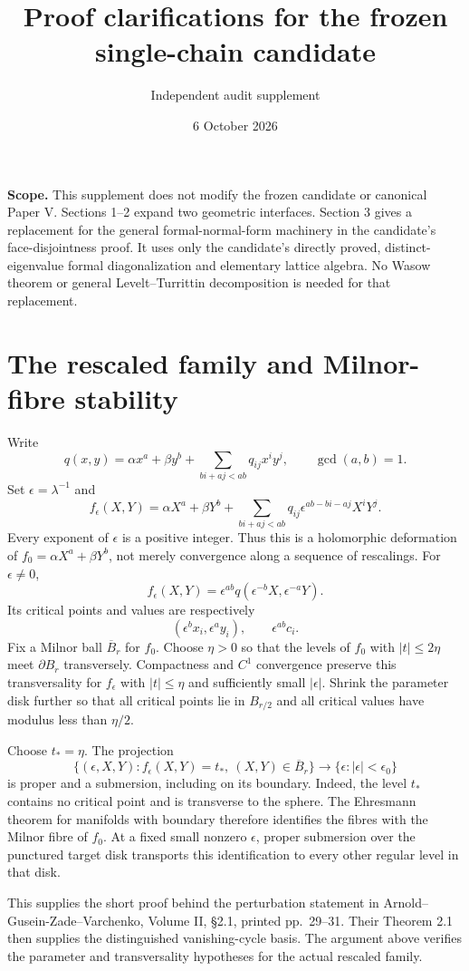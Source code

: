 \documentclass[11pt]{article}
\title{Proof clarifications for the frozen single-chain candidate}
\author{Independent audit supplement}
\date{6 October 2026}
\begin{document}
\maketitle
\noindent\textbf{Scope.} This supplement does not modify the frozen candidate or canonical Paper V. Sections 1--2 expand two geometric interfaces. Section 3 gives a replacement for the general formal-normal-form machinery in the candidate's face-disjointness proof. It uses only the candidate's directly proved, distinct-eigenvalue formal diagonalization and elementary lattice algebra. No Wasow theorem or general Levelt--Turrittin decomposition is needed for that replacement.

\section{The rescaled family and Milnor-fibre stability}
Write
\[
 q(x,y)=\alpha x^a+\beta y^b+
 \sum_{bi+aj<ab}q_{ij}x^iy^j,
 \qquad \gcd(a,b)=1.
\]
Set $\epsilon=\lambda^{-1}$ and
\[
 f_\epsilon(X,Y)=\alpha X^a+\beta Y^b+
 \sum_{bi+aj<ab}q_{ij}\epsilon^{ab-bi-aj}X^iY^j.
\]
Every exponent of $\epsilon$ is a positive integer. Thus this is a holomorphic deformation of $f_0=\alpha X^a+\beta Y^b$, not merely convergence along a sequence of rescalings. For $\epsilon\ne0$,
\[
 f_\epsilon(X,Y)=\epsilon^{ab}q(\epsilon^{-b}X,\epsilon^{-a}Y).
\]
Its critical points and values are respectively
\[
 (\epsilon^b x_i,\epsilon^a y_i),\qquad \epsilon^{ab}c_i.
\]
Fix a Milnor ball $\overline B_r$ for $f_0$. Choose $\eta>0$ so that the levels of $f_0$ with $|t|\le2\eta$ meet $\partial B_r$ transversely. Compactness and $C^1$ convergence preserve this transversality for $f_\epsilon$ with $|t|\le\eta$ and sufficiently small $|\epsilon|$. Shrink the parameter disk further so that all critical points lie in $B_{r/2}$ and all critical values have modulus less than $\eta/2$.

Choose $t_*=\eta$. The projection
\[
 \{(\epsilon,X,Y):f_\epsilon(X,Y)=t_*,\ (X,Y)\in\overline B_r\}
 \longrightarrow\{\epsilon:|\epsilon|<\epsilon_0\}
\]
is proper and a submersion, including on its boundary. Indeed, the level $t_*$ contains no critical point and is transverse to the sphere. The Ehresmann theorem for manifolds with boundary therefore identifies the fibres with the Milnor fibre of $f_0$. At a fixed small nonzero $\epsilon$, proper submersion over the punctured target disk transports this identification to every other regular level in that disk.

This supplies the short proof behind the perturbation statement in Arnold--Gusein-Zade--Varchenko, Volume II, \S2.1, printed pp.~29--31. Their Theorem 2.1 then supplies the distinguished vanishing-cycle basis. The argument above verifies the parameter and transversality hypotheses for the actual rescaled family.
\end{document}
